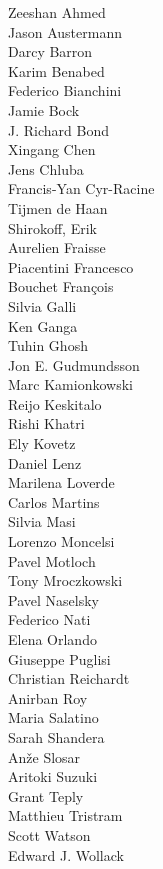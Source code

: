\documentclass[PICOReport.tex]{subfiles}
\begin{document}
\footnotesize {

\begin{multicols}{4}
Zeeshan Ahmed    \\
Jason Austermann    \\
Darcy Barron    \\
Karim Benabed    \\
Federico Bianchini    \\
Jamie Bock    \\
J. Richard Bond    \\
Xingang Chen    \\
Jens Chluba    \\
Francis-Yan Cyr-Racine    \\
Tijmen de Haan    \\
Shirokoff, Erik    \\
Aurelien Fraisse    \\
Piacentini Francesco    \\
Bouchet François    \\
Silvia Galli    \\
Ken Ganga    \\
Tuhin Ghosh    \\
Jon E. Gudmundsson    \\
Marc Kamionkowski    \\
Reijo Keskitalo    \\
Rishi Khatri    \\
Ely Kovetz    \\
Daniel Lenz    \\
Marilena Loverde    \\
Carlos Martins    \\
Silvia Masi    \\
Lorenzo Moncelsi    \\
Pavel Motloch    \\
Tony Mroczkowski    \\
Pavel Naselsky    \\
Federico Nati    \\
Elena Orlando    \\
Giuseppe Puglisi    \\
Christian Reichardt    \\
Anirban Roy    \\
Maria Salatino    \\
Sarah Shandera    \\
An\v{z}e Slosar    \\
Aritoki Suzuki    \\
Grant Teply    \\
Matthieu Tristram    \\
Scott Watson    \\
Edward J. Wollack    
\end{multicols}

}
\end{document}
